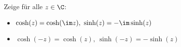 \begin{exercise}
  Zeige für alle $z \in \C$:
  \begin{itemize}
  \item $\cosh(z) = \cosh(\im z), \ \sinh(z) = - \im \sinh(z)$
  \item $\cosh(-z) = \cosh(z), \ \sinh(-z) = - \sinh(z)$
  \end{itemize}
\end{exercise}
